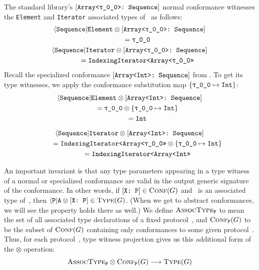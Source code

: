 \documentclass[../generics]{subfiles}
\begin{document}
\begin{example}\label{array type witness example}
The standard library's $\ArraySequence$ normal conformance witnesses the \texttt{Element} and \texttt{Iterator} associated types of \tSequence\ as follows:
\begin{gather*}
\AElement \otimes \ArraySequence \\
\qquad {}  = \rT\\
\AIterator \otimes \ArraySequence\\
\qquad {} = \texttt{IndexingIterator<Array<\rT>>}
\end{gather*}
Recall the specialized conformance $[\texttt{Array<Int>:~Sequence}]$ from . To get its type witnesses, we apply the conformance substitution map $\SubMapInt$:
\begin{gather*}
\AElement \otimes \ArrayIntSequence \\
\qquad {} = \rT \otimes \SubMapInt\\
\qquad {} = \texttt{Int}\\[\medskipamount]
\AIterator \otimes \ArrayIntSequence\\
\qquad {} = \texttt{IndexingIterator<Array<\rT>>}\otimes\SubMapInt\\
\qquad {} = \texttt{IndexingIterator<Array<Int>>}
\end{gather*}
\end{example}

An important invariant is that any type parameters appearing in a type witness of a normal or specialized conformance are valid in the output generic signature of the conformance. In other words, if $[\texttt{X:~P}]\in\textsc{Conf}({G})$ and \nA\ is an associated type of~\tP, then $\langle\texttt{P}|\texttt{A}\otimes[\texttt{X:~P}]\in\textsc{Type}({G})$. (When we get to abstract conformances, we will see the property holds there as well.) We define $\textsc{AssocType}_{\texttt{P}}$ to mean the set of all associated type declarations of a fixed protocol~\tP, and $\textsc{Conf}_{\texttt{P}}({G})$ to be the subset of $\textsc{Conf}({G})$ containing only conformances to some given protocol~\tP. Thus, for each protocol~\tP, type witness projection gives us this additional form of the \index{$\otimes$}$\otimes$ operation:
\[\textsc{AssocType}_{\texttt{P}}\otimes\textsc{Conf}_{\texttt{P}}({G})\longrightarrow\textsc{Type}({G})\]
\end{document}

